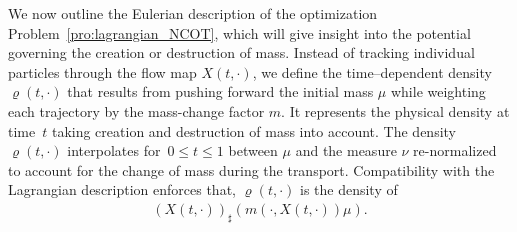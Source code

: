 \documentclass{article}
\theoremstyle{definition}
\begin{document}
We now outline the Eulerian description of the optimization Problem~\ref{pro:lagrangian_NCOT}, which will give insight into the potential governing the creation or destruction of mass.  Instead of tracking individual particles through the flow map $X(t,\cdot)$, we define the time–dependent density $\varrho(t,\cdot)$ that results from pushing forward the initial mass $\mu$ while weighting each trajectory by the mass-change factor $m$. It represents the physical density at time~$t$ taking creation and destruction of mass into account. The density~$\varrho(t, \cdot)$ interpolates for~$0 \leq t \leq 1$ between $\mu$ and the measure $\nu$ re-normalized to account for the change of mass during the transport. Compatibility with the Lagrangian description enforces that, $\varrho(t,\cdot)$ is the density of
\begin{align}\label{equ:density_varrho}
    \left( X(t, \cdot) \right)_{\sharp} \left(m(\cdot,X(t,\cdot)) \mu \right).    
\end{align}
\end{document}
